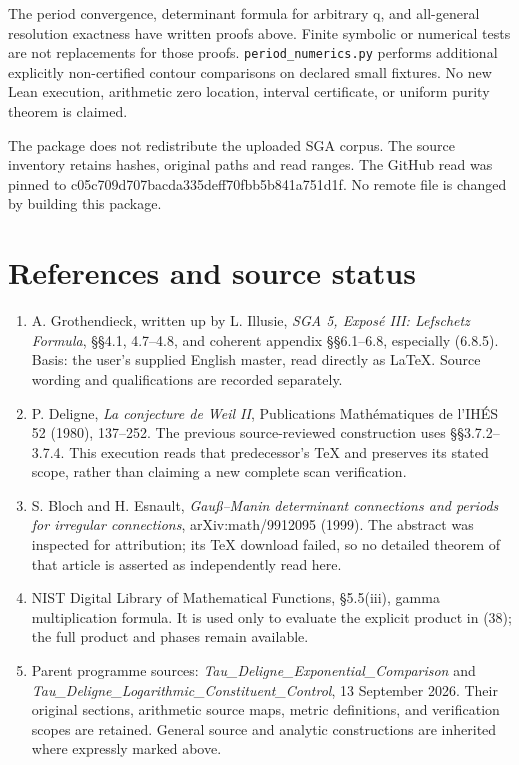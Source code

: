 \documentclass[
  11pt,
]{article}
\providecommand{\tightlist}{%
  \setlength{\itemsep}{0pt}\setlength{\parskip}{0pt}}
\begin{document}
The period convergence, determinant formula for arbitrary q, and
all-general resolution exactness have written proofs above. Finite
symbolic or numerical tests are not replacements for those proofs.
\texttt{period\_numerics.py} performs additional explicitly
non-certified contour comparisons on declared small fixtures. No new
Lean execution, arithmetic zero location, interval certificate, or
uniform purity theorem is claimed.

The package does not redistribute the uploaded SGA corpus. The source
inventory retains hashes, original paths and read ranges. The GitHub
read was pinned to c05c709d707bacda335deff70fbb5b841a751d1f. No remote
file is changed by building this package.

\section{References and source
status}\label{references-and-source-status}

\begin{enumerate}
\def\labelenumi{\arabic{enumi}.}
\tightlist
\item
  A. Grothendieck, written up by L. Illusie, \emph{SGA 5, Exposé III:
  Lefschetz Formula}, §§4.1, 4.7--4.8, and coherent appendix §§6.1--6.8,
  especially (6.8.5). Basis: the user's supplied English master, read
  directly as LaTeX. Source wording and qualifications are recorded
  separately.
\item
  P. Deligne, \emph{La conjecture de Weil II}, Publications
  Mathématiques de l'IHÉS 52 (1980), 137--252. The previous
  source-reviewed construction uses §§3.7.2--3.7.4. This execution reads
  that predecessor's TeX and preserves its stated scope, rather than
  claiming a new complete scan verification.
\item
  S. Bloch and H. Esnault, \emph{Gauß--Manin determinant connections and
  periods for irregular connections}, arXiv:math/9912095 (1999). The
  abstract was inspected for attribution; its TeX download failed, so no
  detailed theorem of that article is asserted as independently read
  here.
\item
  NIST Digital Library of Mathematical Functions, §5.5(iii), gamma
  multiplication formula. It is used only to evaluate the explicit
  product in (38); the full product and phases remain available.
\item
  Parent programme sources: \emph{Tau\_Deligne\_Exponential\_Comparison}
  and \emph{Tau\_Deligne\_Logarithmic\_Constituent\_Control}, 13
  September 2026. Their original sections, arithmetic source maps,
  metric definitions, and verification scopes are retained. General
  source and analytic constructions are inherited where expressly marked
  above.
\end{enumerate}
\end{document}

